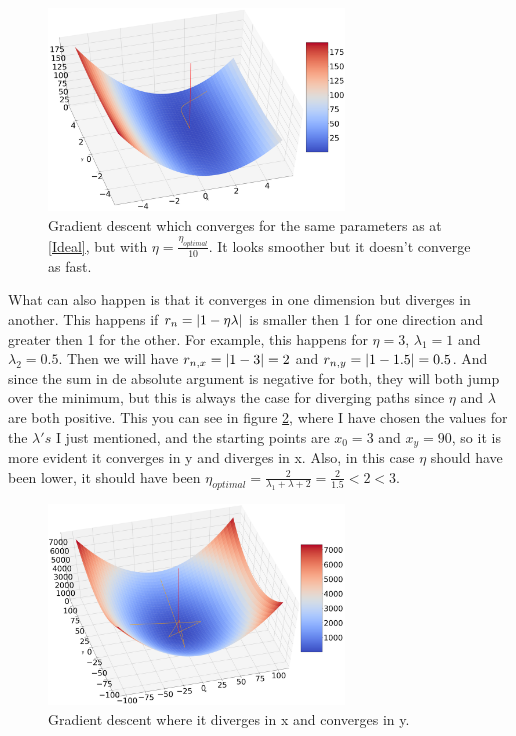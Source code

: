 \documentclass[a4paper]{article}
\begin{document}
\begin{figure}[H]
\includegraphics[width=0.7\textwidth]{Images/SlowConv}
\caption{Gradient descent which converges for the same parameters as at \ref{Ideal}, but with $\eta = \frac{\eta_{optimal}}{10}$. It looks smoother but it doesn't converge as fast.}
\label{SlowConv}
\end{figure} 
\newpage
What can also happen is that it converges in one dimension but diverges in another. This happens if $r_n=\abs{1-\eta \lambda}$ is smaller then 1 for one direction and greater then 1 for the other. For example, this happens for $\eta = 3$, $\lambda_1 = 1$ and $\lambda_2 = 0.5$. Then we will have $r_{n,x} = \abs{1-3} = 2$ and $r_{n,y} = \abs{1-1.5} = 0.5$. And since the sum in de absolute argument is negative for both, they will both jump over the minimum, but this is always the case for diverging paths since $\eta$ and $\lambda$ are both positive. This you can see in figure \ref{TopHalfConv}, where I have chosen the values for the $\lambda's$ I just mentioned, and the starting points are $x_0 = 3$ and $x_y =90$, so it is more evident it converges in y and diverges in x. Also, in this case $\eta$ should have been lower, it should have been $\eta_{optimal} = \frac{2}{\lambda_1+\lambda+2} = \frac{2}{1.5}< 2 < 3$. 

\begin{figure}[H]
\includegraphics[width = 0.7\textwidth]{Images/TopHalfConv}
\caption{Gradient descent where it diverges in x and converges in y.}
\label{TopHalfConv}
\end{figure}
\end{document}
